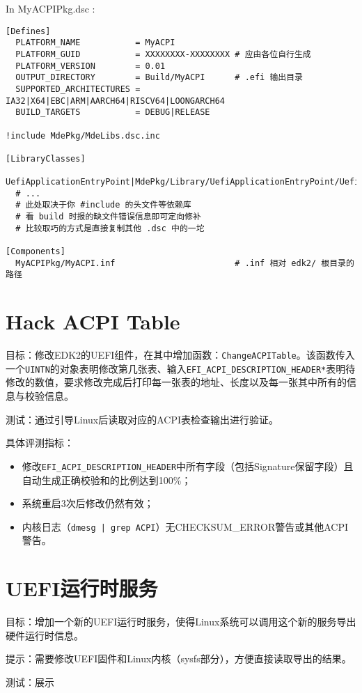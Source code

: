 In MyACPIPkg.dsc :

\begin{lstlisting}
[Defines]
  PLATFORM_NAME           = MyACPI
  PLATFORM_GUID           = XXXXXXXX-XXXXXXXX # 应由各位自行生成
  PLATFORM_VERSION        = 0.01
  OUTPUT_DIRECTORY        = Build/MyACPI      # .efi 输出目录
  SUPPORTED_ARCHITECTURES = IA32|X64|EBC|ARM|AARCH64|RISCV64|LOONGARCH64
  BUILD_TARGETS           = DEBUG|RELEASE

!include MdePkg/MdeLibs.dsc.inc

[LibraryClasses]
  UefiApplicationEntryPoint|MdePkg/Library/UefiApplicationEntryPoint/UefiApplicationEntryPoint.inf
  # ...
  # 此处取决于你 #include 的头文件等依赖库
  # 看 build 时报的缺文件错误信息即可定向修补
  # 比较取巧的方式是直接复制其他 .dsc 中的一坨

[Components]
  MyACPIPkg/MyACPI.inf                        # .inf 相对 edk2/ 根目录的路径
\end{lstlisting}

\section{Hack ACPI Table}
目标：修改EDK2的UEFI组件，在其中增加函数：\texttt{ChangeACPITable}。该函数传入一个\texttt{UINTN}的对象表明修改第几张表、输入\texttt{EFI\_ACPI\_DESCRIPTION\_HEADER*}表明待修改的数值，要求修改完成后打印每一张表的地址、长度以及每一张其中所有的信息与校验信息。

测试：通过引导Linux后读取对应的ACPI表检查输出进行验证。

具体评测指标：
\begin{itemize}
\item 修改\texttt{EFI\_ACPI\_DESCRIPTION\_HEADER}中所有字段（包括Signature保留字段）且自动生成正确校验和的比例达到100\%；
\item 系统重启3次后修改仍然有效；
\item 内核日志（\texttt{dmesg | grep ACPI}）无CHECKSUM\_ERROR警告或其他ACPI警告。
\end{itemize}

\section{UEFI运行时服务}
目标：增加一个新的UEFI运行时服务，使得Linux系统可以调用这个新的服务导出硬件运行时信息。

提示：需要修改UEFI固件和Linux内核（sysfs部分），方便直接读取导出的结果。

测试：展示

